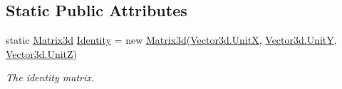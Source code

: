 \subsection*{Static Public Attributes}
\begin{DoxyCompactItemize}
\item 
static \hyperlink{struct_open_t_k_1_1_matrix3d}{Matrix3d} \hyperlink{struct_open_t_k_1_1_matrix3d_aa2f81d7c261f7ef1e11ae8b982ec957e}{Identity} = new \hyperlink{struct_open_t_k_1_1_matrix3d}{Matrix3d}(\hyperlink{struct_open_t_k_1_1_vector3d_a1df7baf64afca7d17602d5f072e188c9}{Vector3d.\-Unit\-X}, \hyperlink{struct_open_t_k_1_1_vector3d_a020b45e3c1a0b417aff18e3deb4a9942}{Vector3d.\-Unit\-Y}, \hyperlink{struct_open_t_k_1_1_vector3d_aa843d07a35e3d275f117d252877d2e55}{Vector3d.\-Unit\-Z})
\begin{DoxyCompactList}\small\item\em The identity matrix. \end{DoxyCompactList}\end{DoxyCompactItemize}
